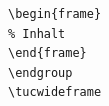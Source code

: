 \begin{frame}[containsverbatim]
\begin{itemize}
\begin{lstlisting}[style=numberedblock,language={[LaTeX]TeX}]
\begin{frame}
% Inhalt
\end{frame}
\endgroup
\tucwideframe
\end{lstlisting}
\endgroup
\end{itemize}
\end{frame}
\endgroup

\tucwideframe
